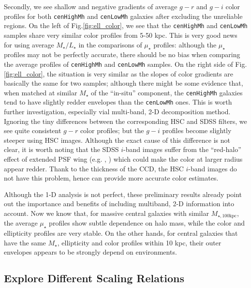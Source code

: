 \documentclass{emulateapj}
\def\rbcg{\texttt{cenHighMh}}
\def\nbcg{\texttt{cenLowMh}}
\def\mstar{{$M_{\star}$}}
\def\mtot{{$M_{\star,100\mathrm{kpc}}$}}
\def\m2l{{$M_{\star}/L_{\star}$}}
\def\mden{{$\mu_{\star}$}}
\newcommand{\update}[1]{\textcolor{Bittersweet}{#1}}
\begin{document}
\begin{CJK*}{UTF8}{gbsn}
    \update{ 
    Secondly, we see shallow and negative gradients of average $g-r$ and $g-i$ color 
    profiles for both \rbcg{} and \nbcg{} galaxies after excluding the unreliable 
    regions. 
    On the left of Fig.\ref{fig:ell_color}, we see that the \rbcg{} and \nbcg{} 
    samples share very similar color profiles from 5-50 kpc. 
    This is very good news for using average \m2l{} in the comparisons of \mden{}
    profiles: although the \mden{} profiles may not be perfectly accurate, there 
    should be no bias when comparing the average profiles of \rbcg{} and \nbcg{} 
    samples.
    On the right side of Fig.\ref{fig:ell_color}, the situation is very similar 
    as the slopes of color gradients are basically the same for two samples; 
    although there might be some evidence that, when matched at similar \mstar{} 
    of the ``in-situ'' component, the \rbcg{} galaxies tend to have slightly redder
    envelopes than the \nbcg{} ones. 
    This is worth further investigation, especially vial multi-band, 2-D 
    decomposition method. 
    Ignoring the tiny differences between the corresponding HSC and SDSS filters, 
    we see quite consistent $g-r$ color profiles; but the $g-i$ profiles become 
    slightly steeper using HSC images. 
    Although the exact cause of this difference is not clear, it is worth noting that
    the SDSS $i$-band images suffer from the ``red-halo'' effect of extended PSF 
    wing (e.g. \citealt{Wu2005}, \citealt{Tal2011}) which could make the color 
    at larger radius appear redder.
    Thank to the thickness of the CCD, the HSC $i$-band images do not have this 
    problem, hence can provide more accurate color estimates.
    }

    \update{
    Although the 1-D analysis is not perfect, these preliminary results already 
    point out the importance and benefits of including multiband, 2-D information 
    into account. 
    Now we know that, for massive central galaxies with similar \mtot{}, the average 
    \mden{} profiles show subtle dependence on halo mass, while the color and 
    ellipticity profiles are very stable.  
    On the other hands, for central galaxies that have the same \mstar{}, ellipticity 
    and color profiles within 10 kpc, their outer envelopes appears to be strongly 
    depend on environments. 
    }
    

\subsection{Explore Different Scaling Relations}
    \label{ssec:scaling}


\end{CJK*}
\end{document}
